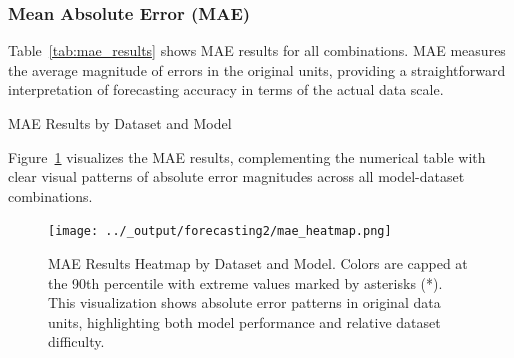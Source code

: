 \documentclass{article}
\begin{document}
\begin{appendices}
\subsubsection{Mean Absolute Error (MAE)}

Table~\ref{tab:mae_results} shows MAE results for all combinations. MAE measures the average magnitude of errors in the original units, providing a straightforward interpretation of forecasting accuracy in terms of the actual data scale.

\begin{table}[htbp]
\centering
\caption{MAE Results by Dataset and Model}
\label{tab:mae_results}

\vspace{0.1cm}

\end{table}

Figure~\ref{fig:mae_heatmap} visualizes the MAE results, complementing the numerical table with clear visual patterns of absolute error magnitudes across all model-dataset combinations.

\begin{figure}[htbp]
\centering
\texttt{[image: ../\_output/forecasting2/mae\_heatmap.png]}
\caption{MAE Results Heatmap by Dataset and Model. Colors are capped at the 90th percentile with extreme values marked by asterisks (*). This visualization shows absolute error patterns in original data units, highlighting both model performance and relative dataset difficulty.}
\label{fig:mae_heatmap}
\end{figure}





\end{appendices}
\end{document}
